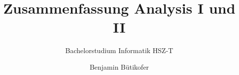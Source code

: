 \title{Zusammenfassung Analysis I und II}
\subtitle{Bachelorstudium Informatik HSZ-T}
\author{Benjamin Bütikofer}